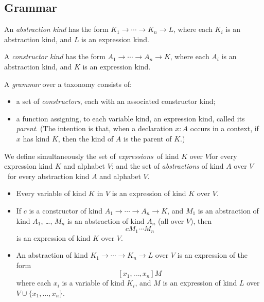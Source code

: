 \documentclass[envcountsame]{llncs}
\begin{document}

\subsection{Grammar}

\begin{definition}
\label{df:kinds}
An \emph{abstraction kind} has the form $K_1 \rightarrow \cdots \rightarrow K_n \rightarrow L$,
where each $K_i$ is an abstraction kind, and $L$ is an expression kind.

A \emph{constructor kind} has the form $A_1 \rightarrow \cdots \rightarrow A_n \rightarrow K$,
where each $A_i$ is an abstraction kind, and $K$ is an expression kind.
\end{definition}

A \emph{grammar} over a taxonomy consists of:
\begin{itemize}
\item
a set of \emph{constructors}, each with an associated constructor kind;
\item
a function assigning, to each variable kind, an expression kind, called its \emph{parent}.  (The intention is that, when a declaration $x : A$ occurs in a context, if $x$ has kind $K$, then the kind of $A$ is the parent of $K$.)
\end{itemize}


\begin{definition}
 We define simultaneously the set of \emph{expressions} of kind $K$ over $V$for every expression kind $K$ and
alphabet $V$;
and the set of \emph{abstractions} of kind $A$ over $V$ for every abstraction kind $A$ and alphabet
$V$.
\begin{itemize}
\item Every variable of kind $K$ in $V$ is an expression of kind $K$ over $V$.
\item If $c$ is a constructor of kind $A_1 \rightarrow \cdots \rightarrow A_n \rightarrow K$,
and $M_1$ is an abstraction of kind $A_1$, \ldots, $M_n$ is an abstraction of kind $A_n$ (all over $V$), then
$$ c M_1 \cdots M_n $$
is an expression of kind $K$ over $V$.
\item
An abstraction of kind $K_1 \rightarrow \cdots \rightarrow K_n \rightarrow L$ over $V$ is
an expression of the form
\[ [x_1, \ldots, x_n] M \]
where each $x_i$ is a variable of kind $K_i$, and $M$ is an expression of kind $L$ over
$V \cup \{ x_1, \ldots, x_n \}$.
\end{itemize}
\end{definition}
\end{document}
